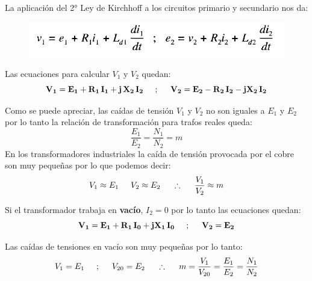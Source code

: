 La aplicación del 2° Ley de Kirchhoff a los circuitos primario y secundario nos da:

 \begin{figure}[H]
	\centering
	\includegraphics[width=0.6\linewidth]{"../Figuras/17"}
\end{figure} 

Las ecuaciones para calcular $V_{1}$ y $V_{2}$ quedan:
\begin{equation}
	\mathbf{V_{1}=E_{1}+R_{1} \, I_{1}+ j \, X_{2} \, I_{2}} \hspace{5mm} ; \hspace{5mm} \mathbf{V_{2}=E_{2} - R_{2}\, I_{2} - j X_{2}\, I_{2}}
\end{equation}
 
Como se puede apreciar, las caídas de tensión $V_{1}$ y $V_{2}$ no son iguales a $E_{1}$ y $E_{2}$ por lo tanto la relación de transformación para trafos reales queda:
\begin{equation}
	\dfrac{E_{1}}{E_{2}}=\dfrac{N_{1}}{N_{2}}=m
\end{equation}
En los transformadores industriales la caída de tensión provocada por el cobre son muy pequeñas por lo que podemos decir:
\begin{equation}
	V_{1} \approx E_{1} \hspace{5mm}  V_{2} \approx E_{2}  \hspace{5mm} \therefore \hspace{5mm} \dfrac{V_{1}}{V_{2}} \approx m
\end{equation}

Si el transformador trabaja en \textbf{vacío}, $I_{2}=0$ por lo tanto las ecuaciones quedan:
\begin{equation}
	\mathbf{V_{1}=E_{1} + R_{1} \, I_{0} + jX_{1} \, I_{0}} \hspace{5mm} ; \hspace{5mm} \mathbf{V_{2}=E_{2}}
\end{equation}

Las caídas de tensiones en vacío son muy pequeñas por lo tanto:
\begin{equation}
	V_{1}=E_{1} \hspace{5mm} ; \hspace{5mm} V_{20}=E_{2} \hspace{5mm} \therefore \hspace{5mm} m=\dfrac{V_{1}}{V_{20}}=\dfrac{E_{1}}{E_{2}}=\dfrac{N_{1}}{N_{2}}
\end{equation}

